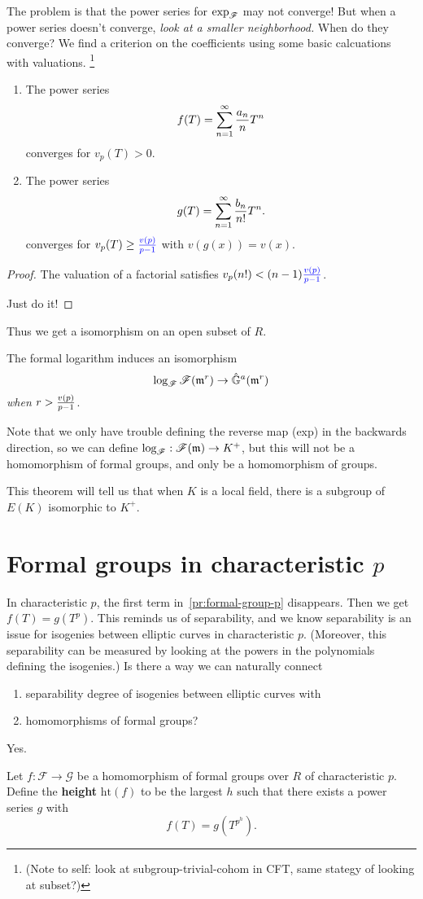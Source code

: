 \vskip0.15in
The problem is that the power series for $\exp_{\mathscr{F}}$ may not converge! 
But when a power series doesn't converge, {\it look at a smaller neighborhood.}
When do they converge? We find a criterion on the coefficients using some basic calcuations with valuations. 
\footnote{(Note to self: look at subgroup-trivial-cohom in CFT, same stategy of looking at subset?)}
\begin{pr}
\begin{enumerate}
\item
The power series
\[
f(T)=\sum_{n=1}^{\infty} \frac{a_n}{n}T^n
\]
converges for $v_p(T)>0$.
\item
The power series 
\[g(T)=\sum_{n=1}^{\infty} \frac{b_n}{n!}T^n.\]
converges for $v_p(T)\ge \color{blue}\frac{v(p)}{p-1}$ with $v(g(x))=v(x)$.
\end{enumerate}
\end{pr}
\begin{proof}
The valuation of a factorial satisfies $v_p(n!)<(n-1){\color{blue}\frac{v(p)}{p-1}}$.

Just do it!
\end{proof}
Thus we get a isomorphism on an open subset of $R$.
\begin{thm}[Silverman 6.4]
The formal logarithm induces an isomorphism
\[\log_{\mathscr F} \mathscr F(\mathfrak{m}^r)\to \hat{\mathbb{G}}^a(\mathfrak{m}^r)
\]
{\it when $r>\frac{v(p)}{p-1}$}.
\end{thm}
Note that we only have trouble defining the reverse map (exp) in the backwards direction, so we can define $\log_{\mathscr F}:\mathscr F(\mathfrak{m})\to K^+$, but this will not be a homomorphism of formal groups, and only be a homomorphism of groups.

This theorem will tell us that when $K$ is a local field, there is a subgroup of $E(K)$ isomorphic to $K^+$.
\section{Formal groups in characteristic $p$}

In characteristic $p$, the first term in~\ref{pr:formal-group-p} disappears. Then we get $f(T)=g(T^p)$. This reminds us of separability, and we know separability is an issue for isogenies between elliptic curves in characteristic $p$. (Moreover, this separability can be measured by looking at the powers in the polynomials defining the isogenies.) 
Is there a way we can naturally connect 
\begin{enumerate}
\item
separability degree of isogenies between elliptic curves with
\item
 homomorphisms of formal groups?
\end{enumerate}
Yes.
\begin{df}
Let $f:\mathscr F\to \mathscr G$ be a homomorphism of formal groups over $R$ of characteristic $p$. Define the \textbf{height} $\text{ht}(f)$ to be the largest $h$ such that there exists a power series $g$ with
\[
f(T)=g(T^{p^h}).
\]
\end{df}

